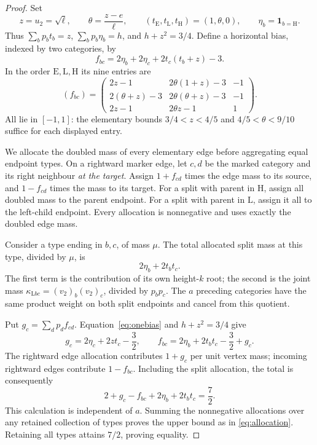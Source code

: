 \documentclass[10pt,a4paper]{amsart}
\newcommand{\E}{\mathrm E}
\newcommand{\HH}{\mathrm H}
\newcommand{\LL}{\mathrm L}
\newcommand{\ind}{\mathbf1}
\begin{document}
\begin{proof}
Set
\[
z=u_2=\sqrt\ell,\qquad \theta=\frac{z-e}{\ell},\qquad
(t_\E,t_\LL,t_\HH)=(1,\theta,0),\qquad \eta_b=\ind_{b=\HH}.
\]
Thus $\sum_b p_bt_b=z$, $\sum_b p_b\eta_b=h$, and $h+z^2=3/4$.
Define a horizontal bias, indexed by two categories, by
\begin{equation}\label{eq:onebias}
f_{bc}=2\eta_b+2\eta_c+2t_c(t_b+z)-3.
\end{equation}
In the order $\E,\LL,\HH$ its nine entries are
\begin{equation}\label{eq:biasmatrix}
(f_{bc})=
\begin{pmatrix}
2z-1&2\theta(1+z)-3&-1\\
2(\theta+z)-3&2\theta(\theta+z)-3&-1\\
2z-1&2\theta z-1&1
\end{pmatrix}.
\end{equation}
All lie in $[-1,1]$: the elementary bounds $3/4<z<4/5$ and $4/5<\theta<9/10$ suffice for each displayed entry.

We allocate the doubled mass of every elementary edge before aggregating equal endpoint types. On a rightward marker edge, let $c,d$ be the marked category and its right neighbour \emph{at the target}. Assign $1+f_{cd}$ times the edge mass to its source, and $1-f_{cd}$ times the mass to its target. For a split with parent in $\HH$, assign all doubled mass to the parent endpoint. For a split with parent in $\LL$, assign it all to the left-child endpoint. Every allocation is nonnegative and uses exactly the doubled edge mass.

Consider a type ending in $b,c$, of mass $\mu$. The total allocated split mass at this type, divided by $\mu$, is
\[
2\eta_b+2t_bt_c.
\]
The first term is the contribution of its own height-$k$ root; the second is the joint mass $\kappa_{\LL bc}=(v_2)_b(v_2)_c$, divided by $p_bp_c$. The $a$ preceding categories have the same product weight on both split endpoints and cancel from this quotient.

Put $g_c=\sum_d p_df_{cd}$. Equation~\eqref{eq:onebias} and $h+z^2=3/4$ give
\[
g_c=2\eta_c+2zt_c-\frac32,\qquad
f_{bc}=2\eta_b+2t_bt_c-\frac32+g_c.
\]
The rightward edge allocation contributes $1+g_c$ per unit vertex mass; incoming rightward edges contribute $1-f_{bc}$. Including the split allocation, the total is consequently
\[
2+g_c-f_{bc}+2\eta_b+2t_bt_c=\frac72.
\]
This calculation is independent of $a$. Summing the nonnegative allocations over any retained collection of types proves the upper bound as in \eqref{eq:allocation}. Retaining all types attains $7/2$, proving equality.
\end{proof}
\end{document}

